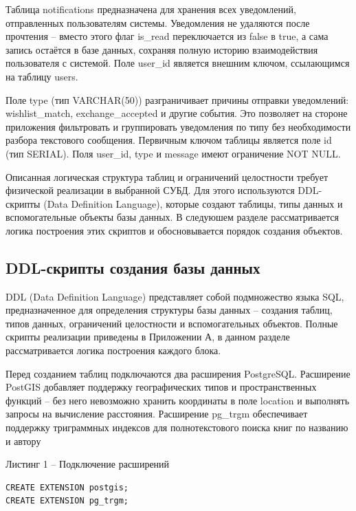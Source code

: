 \documentclass[14pt,a4paper]{extarticle}
\begin{document}
Таблица notifications предназначена для хранения всех уведомлений,
отправленных пользователям системы. Уведомления не удаляются после
прочтения -- вместо этого флаг is\_read переключается из false в true, а
сама запись остаётся в базе данных, сохраняя полную историю
взаимодействия пользователя с системой. Поле user\_id является внешним
ключом, ссылающимся на таблицу users.

Поле type (тип VARCHAR(50)) разграничивает причины отправки уведомлений:
wishlist\_match, exchange\_accepted и другие события. Это позволяет на стороне
приложения фильтровать и группировать уведомления по типу без
необходимости разбора текстового сообщения. Первичным ключом таблицы
является поле id (тип SERIAL). Поля user\_id, type и message имеют
ограничение NOT NULL.

Описанная логическая структура таблиц и ограничений целостности требует
физической реализации в выбранной СУБД. Для этого используются
DDL-скрипты (Data Definition Language), которые создают таблицы, типы
данных и вспомогательные объекты базы данных. В следуюшем разделе
рассматривается логика построения этих скриптов и обосновывается порядок
создания объектов.

\subsection{DDL-скрипты создания базы данных}

DDL (Data Definition Language) представляет собой подмножество языка
SQL, предназначенное для определения структуры базы данных -- создания
таблиц, типов данных, ограничений целостности и вспомогательных
объектов. Полные скрипты реализации приведены в Приложении А, в данном
разделе рассматривается логика построения каждого блока.

Перед созданием таблиц подключаются два расширения PostgreSQL.
Расширение PostGIS добавляет поддержку географических типов и
пространственных функций -- без него невозможно хранить координаты в
поле location и выполнять запросы на вычисление расстояния. Расширение
pg\_trgm обеспечивает поддержку триграммных индексов для полнотекстового
поиска книг по названию и автору

\begin{center}
Листинг 1 -- Подключение расширений
\end{center}
\begin{lstlisting}
CREATE EXTENSION postgis;
CREATE EXTENSION pg_trgm;
\end{lstlisting}
\end{document}
